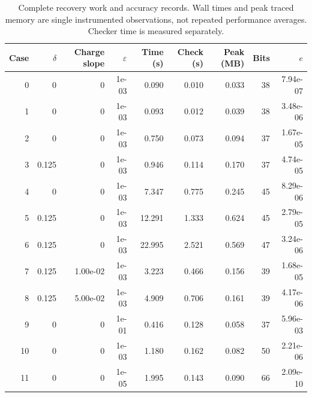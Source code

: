 \begin{table}[p]\centering
\caption{Complete recovery work and accuracy records. Wall times and peak traced memory are single instrumented observations, not repeated performance averages. Checker time is measured separately.}\label{tab:r44-work}
\small\begin{tabular}{rrrrrrrrr}\toprule
Case & $\delta$ & Charge slope & $\varepsilon$ & Time (s) & Check (s) & Peak (MB) & Bits & $e$\\\midrule
0 & 0 & 0 & 1e-03 & 0.090 & 0.010 & 0.033 & 38 & 7.94e-07\\
1 & 0 & 0 & 1e-03 & 0.093 & 0.012 & 0.039 & 38 & 3.48e-06\\
2 & 0 & 0 & 1e-03 & 0.750 & 0.073 & 0.094 & 37 & 1.67e-05\\
3 & 0.125 & 0 & 1e-03 & 0.946 & 0.114 & 0.170 & 37 & 4.74e-05\\
4 & 0 & 0 & 1e-03 & 7.347 & 0.775 & 0.245 & 45 & 8.29e-06\\
5 & 0.125 & 0 & 1e-03 & 12.291 & 1.333 & 0.624 & 45 & 2.79e-05\\
6 & 0.125 & 0 & 1e-03 & 22.995 & 2.521 & 0.569 & 47 & 3.24e-06\\
7 & 0.125 & 1.00e-02 & 1e-03 & 3.223 & 0.466 & 0.156 & 39 & 1.68e-05\\
8 & 0.125 & 5.00e-02 & 1e-03 & 4.909 & 0.706 & 0.161 & 39 & 4.17e-06\\
9 & 0 & 0 & 1e-01 & 0.416 & 0.128 & 0.058 & 37 & 5.96e-03\\
10 & 0 & 0 & 1e-03 & 1.180 & 0.162 & 0.082 & 50 & 2.21e-06\\
11 & 0 & 0 & 1e-05 & 1.995 & 0.143 & 0.090 & 66 & 2.09e-10\\
\bottomrule\end{tabular}
\end{table}

